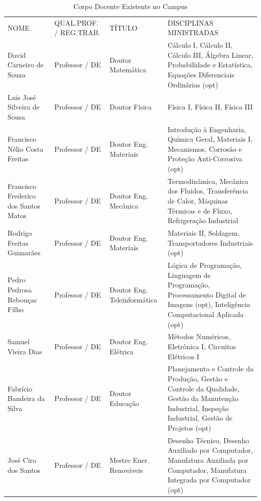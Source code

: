 \documentclass{paper}
\begin{document}
    \begin{longtable}{|p{3.0cm}|p{2.5cm}|p{2.0cm}|p{6.3cm}|}
    \caption{Corpo Docente Existente no Campus}\label{tab2} 
    \vspace{-0.25cm}
    \\ \hline 
    \cellcolor{\cinza}NOME & \cellcolor{\cinza}QUAL.PROF. / REG.TRAB. & \cellcolor{\cinza}TÍTULO & \cellcolor{\cinza}DISCIPLINAS MINISTRADAS \\ 
    \hline
    David Carneiro de Souza   &  Professor / DE  &  Doutor Matemática &  Cálculo I, Cálculo II, Cálculo III, Álgebra Linear, Probabilidade e Estatística, Equações Diferenciais Ordinárias (opt) \\ \hline
    Luis José Silveira de Sousa & Professor / DE  &  Doutor Física  &  Física I, Física II, Física III \\ \hline
    Francisco Nélio Costa Freitas  &  Professor / DE  & Doutor Eng. Materiais  &  Introdução à Engenharia, Química Geral, Materiais I, Mecanismos, Corrosão e Proteção Anti-Corrosiva (opt) \\ \hline
    Francisco Frederico dos Santos Matos   &  Professor / DE  &  Doutor Eng. Mecânica  &  Termodinâmica, Mecânica dos Fluidos, Transferência de Calor, Máquinas Térmicas e de Fluxo, Refrigeração Industrial \\ \hline
    Rodrigo Freitas Guimarães   &  Professor / DE  &  Doutor Eng. Materiais  &  Materiais II, Soldagem, Transportadores Industriais (opt) \\ \hline
    Pedro Pedrosa Rebouças Filho & Professor / DE  &  Doutor Eng. Teleinformática  & Lógica de Programação, Linguagem de Programação, Processamento Digital de Imagens (opt), Inteligência Computacional Aplicada (opt) \\ \hline
    Samuel Vieira Dias & Professor / DE  &  Doutor Eng. Elétrica  &  Métodos Numéricos, Eletrônica I, Circuitos Elétricos I \\ \hline
   Fabrício Bandeira da Silva  &  Professor / DE & Doutor Educação  &  Planejamento e Controle da Produção, Gestão e Controle da Qualidade, Gestão da Manutenção Industrial, Inspeção Industrial, Gestão de Projetos (opt)    \\ \hline
    José Ciro dos Santos & Professor / DE  &  Mestre Ener. Renováveis  &  Desenho Técnico, Desenho Auxiliado por Computador, Manufatura Auxiliada por Computador, Manufatura Integrada por Computador (opt) \\ \hline

\end{longtable}
\end{document}
